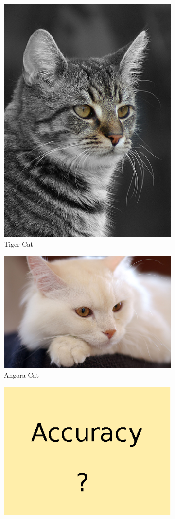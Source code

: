\documentclass[conference]{IEEEtran}
\begin{document}
\begin{spacing}{0.9}
\begin{figure}
\begin{subfigure}{.15\textwidth}
  \includegraphics[scale=0.15]{classTypeExample7.jpg}
  \caption{Tiger Cat}
\end{subfigure}
\begin{subfigure}{.15\textwidth}
  \centering
  \includegraphics[scale=0.1]{classTypeExample8.jpg}
  \caption{Angora Cat}
\end{subfigure}
\begin{subfigure}{.15\textwidth}
  \centering
  \includegraphics[scale=0.3]{Accuracy.ps}

\end{subfigure}
\end{figure}
\end{spacing}
\end{document}
